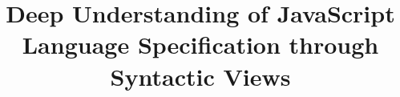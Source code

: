 \documentclass[sigconf,review,anonymous]{acmart}
\begin{document}
\title[Deep Understanding of JavaScript Specification
through Syntactic Views]
{Deep Understanding of JavaScript Language Specification
through Syntactic Views}




% 
% 
% 


\end{document}

